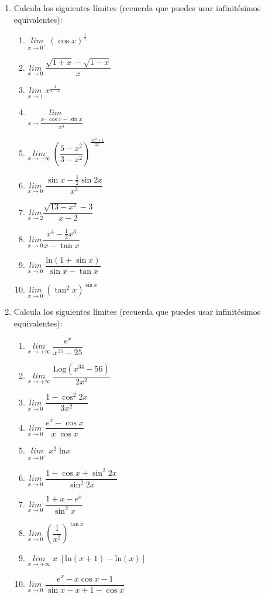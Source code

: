 \begin{enumerate}
\item Calcula los siguientes límites (recuerda que puedes usar infinitésimos equivalentes):
	\begin{multicols}{2}
	\begin{enumerate}
	\item $\underset{x\to 0^+}{lim}\;{\left( \cos x \right)}^{\frac 1 x}$
	\item  $\underset{x\to0}{lim}\;{\dfrac {\sqrt{1+x}-\sqrt{1-x}}{x}}$
	\item  $\underset{x\to 1}{lim}\;{x^{\frac {1}{1-x}}}$
	\item  $\underset{x\to \dfrac {x \cdot \cos x - \sin x}{x^3}}{lim}\;{}$
	\item  $\underset{x\to-\infty}{lim}\;{\left( \dfrac {5-x^2}{3-x^2}\right)}^{\frac {3x^2+1}{2x}}$
	\item  $\underset{x\to 0}{lim}\;{\dfrac {\sin x - \frac 1 2 \sin 2x}{x^3}}$
	\item $\underset{x\to 2}{lim}{\dfrac {\sqrt{13-x^2}-3}{x-2}}$
	\item $\underset{x\to 0}{lim}{\dfrac {x^4 - \frac 1 3 x^3}{x-\tan x}}$
	\item $\underset{x\to 0 }{lim}\; {\dfrac {\mathrm{ln}(1+\sin x)}{\sin x - \tan x}}$
	\item $\underset{x\to 0}{lim}\; {(\tan^2 x)^{\sin x}}$
	\end{enumerate}	
	\end{multicols}

\rightline{\textcolor{gris}{Soluciones: $a)\; ;1\quad b)\; 1/3;\quad c)\; 1/e; \quad d)\; -1/3; \quad e)\; 1$}}
\rightline{\textcolor{gris}{$ f)\; 1/2; \quad g)\; -2/3; \quad h)\; 1\quad i)\; -\infty; \quad j)\; 1 $}}

\item Calcula los siguientes límites (recuerda que puedes usar infinitésimos equivalentes):
	\begin{multicols}{2}
	\begin{enumerate}
	\item  $\underset{x\to +\infty}{lim}\;{\dfrac {e^x}{x^{35}-25}}$
	\item  $\underset{x\to +\infty}{lim}\;{\dfrac {\mathrm{Log}(x^{34}-56)}{2x^2}}$
	\item  $\underset{x\to 0}{lim}\;{\dfrac {1-\cos^2 2x}{3x^2}}$
	\item  $\underset{x\to 0}{lim}\;{\dfrac {e^x-\cos x}{x\; \cos x}}$
	\item  $\underset{x\to 0^+}{lim}\;{x^2 \; \mathrm{ln}x}$
	\item  $\underset{x\to 0}{lim}\;{\dfrac {1-\cos x + \sin^2 2x}{\sin^2 2x}}$
	\item  $\underset{x\to 0}{lim}\;{\dfrac {1+x-e^x}{\sin^2 x}}$	
	\item  $\underset{x\to 0}{lim}\;{\left( \dfrac 1 {x^2}\right)^{\tan x}}$
	\item  $\underset{x\to +\infty}{lim}\;{x\; [\mathrm{ln}(x+1)-\mathrm{ln}(x)]}$
	\item  $\underset{x\to 0}{lim}\;{\dfrac {e^x-x \cos x -1}{\sin x - x +1 -\cos x}}$
	\end{enumerate}	
	\end{multicols}


\end{enumerate}
